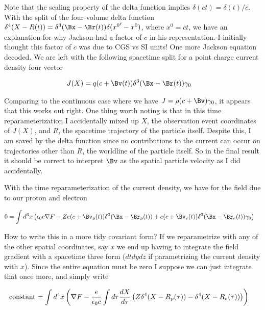 Note that the scaling property of the delta function implies $\delta(c t) = \delta(t)/c$.  With the split of the four-volume delta function $\delta^4(X - R(t)) = \delta^3(\Bx - \Br(t)) \delta( {x^0}' - x^0 )$, where $x^0 = c t$, we have an explanation for why Jackson had a factor of $c$ in his representation.  I initially thought this factor of $c$ was due to CGS vs SI units!  One more Jackson equation decoded.  We are left with the following spacetime split for a point charge current density four vector

\begin{align}\label{eqn:nuclearInteraction:boo11}
J(X) 
&= q (c + \Bv(t))\delta^3 (\Bx - \Br(t)) \gamma_0 
\end{align}

Comparing to the continuous case where we have $J = \rho ( c + \Bv ) \gamma_0$, it appears that this works out right.  One thing worth noting is that in this time reparameterization I accidentally mixed up $X$, the observation event coordinates of $J(X)$, and $R$, the spacetime trajectory of the particle itself.  Despite this, I am saved by the delta function since no contributions to the current can occur on trajectories other than $R$, the worldline of the particle itself.  So in the final result it should be correct to interpret $\Bv$ as the spatial particle velocity as I did accidentally.

With the time reparameterization of the current density, we have for the field due to our proton and electron

\begin{align}\label{eqn:nuclearInteraction:boo8}
0 &= \int d^3 x \left( \epsilon_0 c \grad F - Z e (c + \Bv_p(t))\delta^3 (\Bx - \Br_p(t)) + e (c + \Bv_e(t))\delta^3 (\Bx - \Br_e(t)) 
\gamma_0 \right)
\end{align}

How to write this in a more tidy covariant form?  If we reparametrize with any of the other spatial coordinates, say $x$ we end up having to integrate the field gradient with a spacetime three form ($dt dy dz$ if parametrizing the current density with $x$).  Since the entire equation must be zero I suppose we can just integrate that once more, and simply write

\begin{align}\label{eqn:nuclearInteraction:boo9}
\text{constant} &= \int d^4 x \left( \nabla F - \frac{e}{\epsilon_0 c}\int d\tau \frac{dX}{d\tau} \left( Z \delta^4 (X - R_p(\tau)) - \delta^4 (X - R_e(\tau)) \right) \right)
\end{align}

